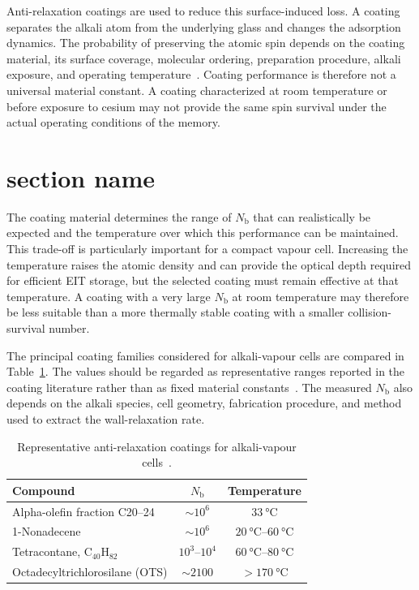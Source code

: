 Anti-relaxation coatings are used to reduce this surface-induced loss. A coating separates the alkali atom from the underlying glass and changes the adsorption dynamics. The probability of preserving the atomic spin depends on the coating material, its surface coverage, molecular ordering, preparation procedure, alkali exposure, and operating temperature~\cite{Aiacoavc_ChiEtAl_2020}. Coating performance is therefore not a universal material constant. A coating characterized at room temperature or before exposure to cesium may not provide the same spin survival under the actual operating conditions of the memory.

\section{section name}%
\label{sec:section name}


The coating material determines the range of $N_{\mathrm{b}}$ that can realistically be expected and the temperature over which this performance can be maintained. This trade-off is particularly important for a compact vapour cell. Increasing the temperature raises the atomic density and can provide the optical depth required for efficient EIT storage, but the selected coating must remain effective at that temperature. A coating with a very large $N_{\mathrm{b}}$ at room temperature may therefore be less suitable than a more thermally stable coating with a smaller collision-survival number.

The principal coating families considered for alkali-vapour cells are compared in Table~\ref{tab:coating_comparison}. The values should be regarded as representative ranges reported in the coating literature rather than as fixed material constants~\cite{Aiacoavc_ChiEtAl_2020}. The measured $N_{\mathrm{b}}$ also depends on the alkali species, cell geometry, fabrication procedure, and method used to extract the wall-relaxation rate.

\begin{table}[htbp]
    \centering
    \label{tab:coating_comparison}
    \begin{tabular}{lcc}
        \hline
        \textbf{Compound} & \textbf{$N_{\mathrm{b}}$} & \textbf{Temperature} \\
        \hline
        Alpha-olefin fraction C20--24 & $\sim 10^{6}$ & $\SI{33}{\degreeCelsius}$ \\
            1-Nonadecene & $\sim 10^6$  & $\SIrange{20}{60}{\degreeCelsius}$ \\
        Tetracontane, $\mathrm{C}_{40}\mathrm{H}_{82}$ & $10^{3}$--$10^{4}$ & $\SIrange{60}{80}{\degreeCelsius}$ \\
        Octadecyltrichlorosilane (OTS) & $\sim 2100$ & $>\SI{170}{\degreeCelsius}$ \\
        \hline
    \end{tabular}
    \caption{Representative anti-relaxation coatings for alkali-vapour cells~\cite{Aiacoavc_ChiEtAl_2020}.}
\end{table}

